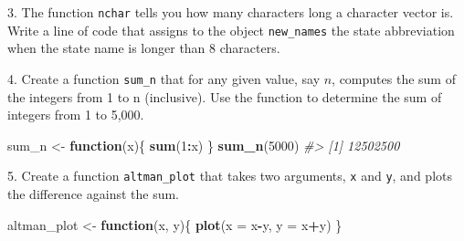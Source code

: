 \documentclass[
]{krantz}
\newenvironment{Shaded}{\begin{snugshade}}{\end{snugshade}}
\newcommand{\CommentTok}[1]{\textcolor[rgb]{0.37,0.37,0.37}{\textit{#1}}}
\newcommand{\ControlFlowTok}[1]{\textcolor[rgb]{0.27,0.27,0.27}{\textbf{#1}}}
\newcommand{\DataTypeTok}[1]{\textcolor[rgb]{0.27,0.27,0.27}{#1}}
\newcommand{\DecValTok}[1]{\textcolor[rgb]{0.06,0.06,0.06}{#1}}
\newcommand{\KeywordTok}[1]{\textcolor[rgb]{0.27,0.27,0.27}{\textbf{#1}}}
\newcommand{\NormalTok}[1]{#1}
\newcommand{\OperatorTok}[1]{\textcolor[rgb]{0.43,0.43,0.43}{\textbf{#1}}}
\newcommand{\StringTok}[1]{\textcolor[rgb]{0.5,0.5,0.5}{#1}}
\begin{document}
3. The function \texttt{nchar} tells you how many characters long a character vector is. Write a line of code that assigns to the object \texttt{new\_names} the state abbreviation when the state name is longer than 8 characters.

\begin{Shaded}
\end{Shaded}

4. Create a function \texttt{sum\_n} that for any given value, say \(n\), computes the sum of the integers from 1 to n (inclusive). Use the function to determine the sum of integers from 1 to 5,000.

\begin{Shaded}
\begin{Highlighting}[]
\NormalTok{sum_n <-}\StringTok{ }\ControlFlowTok{function}\NormalTok{(x)\{}
  \KeywordTok{sum}\NormalTok{(}\DecValTok{1}\OperatorTok{:}\NormalTok{x)}
\NormalTok{\}}
\KeywordTok{sum_n}\NormalTok{(}\DecValTok{5000}\NormalTok{)}
\CommentTok{#> [1] 12502500}
\end{Highlighting}
\end{Shaded}

5. Create a function \texttt{altman\_plot} that takes two arguments, \texttt{x} and \texttt{y}, and plots the difference against the sum.

\begin{Shaded}
\begin{Highlighting}[]
\NormalTok{altman_plot <-}\StringTok{ }\ControlFlowTok{function}\NormalTok{(x, y)\{}
  \KeywordTok{plot}\NormalTok{(}\DataTypeTok{x =}\NormalTok{ x}\OperatorTok{-}\NormalTok{y, }\DataTypeTok{y =}\NormalTok{ x}\OperatorTok{+}\NormalTok{y)}
\NormalTok{\}}
\end{Highlighting}
\end{Shaded}
\end{document}
